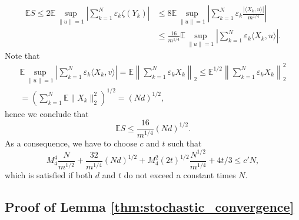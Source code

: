 \documentclass[12pt]{article}
\def\l{\left}
\def\r{\right}
\newcommand{\mb}{\mathbb}
\theoremstyle{thmstyletwo}%
\theoremstyle{thmstylethree}%
\begin{document}
\begin{align*}
    \mb{E}S 
    \leq 2\mb{E}\sup_{\|u\| = 1}\left|\sum_{k=1}^N \varepsilon_k\zeta(Y_k)\right|
    &\leq 8\mb{E}\sup_{\|u\| = 1}\left|\sum_{k=1}^N \varepsilon_k \frac{|\langle X_k, u\rangle|}{m^{1/4}}\right|
    \\
    &\leq \frac{16}{m^{1/4}}\mb{E}\sup_{\|u\| = 1}\left|\sum_{k=1}^N \varepsilon_k \langle X_k, u\rangle\right|.
\end{align*}
Note that 
\begin{multline*}
\mb{E}\sup_{\|u\| = 1}\left|\sum_{k=1}^N \varepsilon_k \langle X_k, v\rangle\right| = \mb E \l\| \sum_{k=1}^N \varepsilon_k  X_k \r\|_2 \leq \mb E^{1/2}\l\| \sum_{k=1}^N  \varepsilon_k  X_k  \r\|_2^2
\\
=\l( \sum_{k=1}^N \mb E \|X_k\|_2^2 \r)^{1/2} = \l( N  d\r)^{1/2},
\end{multline*}
hence we conclude that 
\begin{equation} 
     \mb{E} S \leq \frac{16}{m^{1/4}} \l( N  d\r)^{1/2}.
\end{equation}
As a consequence, we have to choose $c$ and $t$ such that 
\begin{equation}    
\label{eq:t:rank}
M_4^4 \frac{N}{m^{1/2}}+\frac{32}{m^{1/4}} \l( N  d\r)^{1/2}+M_4^2 (2t)^{1/2}\frac{N^{1/2}}{m^{1/4}}+4t/3\leq c'N,
\end{equation}
which is satisfied if both $d$ and $t$ do not exceed a constant times $N$. 





\subsection{Proof of Lemma \ref{thm:stochastic_convergence}}
\label{proof:thm:stochastic_convergence}
\end{document}
